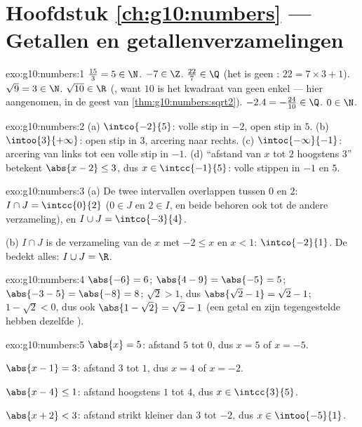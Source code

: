 \section*{Hoofdstuk \ref{ch:g10:numbers} --- Getallen en getallenverzamelingen}

\begin{solution}{exo:g10:numbers:1}
$\frac{15}{3} = 5 \in \N$. \quad $-7 \in \Z$. \quad
$\frac{22}{7} \in \Q$ (het is geen : $22 = 7 \times 3 + 1$).
\quad $\sqrt 9 = 3 \in \N$. \quad $\sqrt{10} \in \R$ (, want
$10$ is het kwadraat van geen enkel  --- hier aangenomen, in
de geest van \cref{thm:g10:numbers:sqrt2}). \quad
$-2.4 = -\frac{24}{10} \in \Q$. \quad $0 \in \N$.
\end{solution}

\begin{solution}{exo:g10:numbers:2}
(a) $\intco{-2}{5}$: volle stip in $-2$, open stip in $5$.
(b) $\intoo{3}{+\infty}$: open stip in $3$, arcering naar rechts.
(c) $\intoc{-\infty}{-1}$: arcering van links tot een volle stip in $-1$.
(d) ``afstand van $x$ tot $2$ hoogstens $3$'' betekent $\abs{x - 2} \leq 3$,
dus $x \in \intcc{-1}{5}$: volle stippen in $-1$ en $5$.
\end{solution}

\begin{solution}{exo:g10:numbers:3}
(a) De twee intervallen overlappen tussen $0$ en $2$:
$I \cap J = \intcc{0}{2}$ ($0 \in J$ en $2 \in I$, en beide behoren ook tot
de andere verzameling), en $I \cup J = \intco{-3}{4}$.

(b) $I \cap J$ is de verzameling van de $x$ met $-2 \leq x$ en $x < 1$:
$\intco{-2}{1}$. De  bedekt alles: $I \cup J = \R$.
\end{solution}

\begin{solution}{exo:g10:numbers:4}
$\abs{-6} = 6$; \quad $\abs{4 - 9} = \abs{-5} = 5$; \quad
$\abs{-3 - 5} = \abs{-8} = 8$; \quad
$\sqrt 2 > 1$, dus $\abs{\sqrt2 - 1} = \sqrt2 - 1$; \quad
$1 - \sqrt2 < 0$, dus ook $\abs{1 - \sqrt2} = \sqrt2 - 1$ (een getal en zijn
tegengestelde hebben dezelfde ).
\end{solution}

\begin{solution}{exo:g10:numbers:5}
$\abs{x} = 5$: afstand $5$ tot $0$, dus $x = 5$ of $x = -5$.

$\abs{x - 1} = 3$: afstand $3$ tot $1$, dus $x = 4$ of $x = -2$.

$\abs{x - 4} \leq 1$: afstand hoogstens $1$ tot $4$, dus
$x \in \intcc{3}{5}$.

$\abs{x + 2} < 3$: afstand strikt kleiner dan $3$ tot $-2$, dus
$x \in \intoo{-5}{1}$.
\end{solution}

